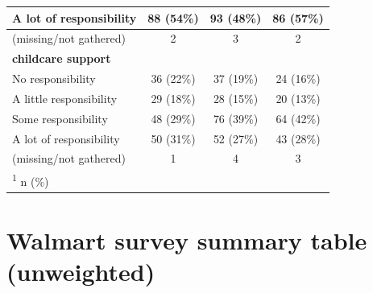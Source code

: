 \documentclass[
  11pt,
  oneside]{article}
\begin{document}
\begin{table}
\begin{tabular}[t]{l|c|c|c}
\hline
\hspace{1em}A lot of responsibility & 88 (54\%) & 93 (48\%) & 86 (57\%)\\
\hline
\hspace{1em}(missing/not gathered) & 2 & 3 & 2\\
\hline
\textbf{childcare support} &  &  & \\
\hline
\hspace{1em}No responsibility & 36 (22\%) & 37 (19\%) & 24 (16\%)\\
\hline
\hspace{1em}A little responsibility & 29 (18\%) & 28 (15\%) & 20 (13\%)\\
\hline
\hspace{1em}Some responsibility & 48 (29\%) & 76 (39\%) & 64 (42\%)\\
\hline
\hspace{1em}A lot of responsibility & 50 (31\%) & 52 (27\%) & 43 (28\%)\\
\hline
\hspace{1em}(missing/not gathered) & 1 & 4 & 3\\
\hline
\multicolumn{4}{l}{\rule{0pt}{1em}\textsuperscript{1} n (\%)}\\
\end{tabular}
\end{table}

\FloatBarrier
\newpage

\section{Walmart survey summary table (unweighted)}\label{app-wmt-survsum}
\end{document}
